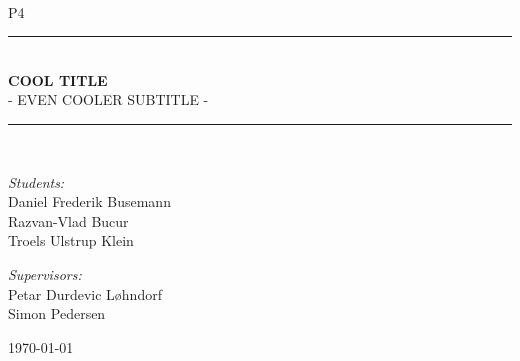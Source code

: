 \newcommand{\HRule}{\rule{\linewidth}{0.5 mm}}
\begin{titlepage}

\begin{center}
\\[0.5cm]

\textsc{\Large P4}\\[0.6cm]

\HRule \\[0.8cm]
{ \Huge \bfseries  COOL TITLE}\\[0.4cm]

  \Large{ - EVEN COOLER SUBTITLE -
  }
\HRule \\[1.2cm]

\begin{minipage}{0.49\textwidth}
\begin{flushleft} \large
\emph{Students:}\\
Daniel Frederik Busemann\\
Razvan-Vlad Bucur\\
Troels Ulstrup Klein\\
\end{flushleft}
\end{minipage}
\begin{minipage}{0.49\textwidth}
\begin{flushright} \large
\emph{Supervisors:} \\
Petar Durdevic Løhndorf\\
Simon Pedersen
\end{flushright}
\end{minipage}

\vfill

{\large \today}



\end{center}

\end{titlepage}
